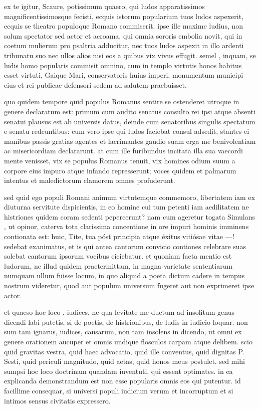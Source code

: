  ex te igitur, Scaure, potissimum quaero, qui ludos apparatissimos magnificentissimosque fecisti, ecquis istorum popularium tuos ludos aspexerit, ecquis se theatro populoque Romano commiserit. ipse ille maxime ludius, non solum spectator sed actor et acroama, qui omnia sororis embolia novit, qui in coetum mulierum pro psaltria adducitur, nec tuos ludos aspexit in illo ardenti tribunatu suo nec ullos alios nisi eos a quibus vix vivus effugit. semel , inquam, se ludis homo popularis commisit omnino, cum in templo virtutis honos habitus esset virtuti, Gaique Mari, conservatoris huius imperi, monumentum municipi eius et rei publicae defensori sedem ad salutem praebuisset.

 quo quidem tempore quid populus Romanus sentire se ostenderet utroque in genere declaratum est: primum cum audito senatus consulto rei ipsi atque absenti senatui plausus est ab universis datus, deinde cum senatoribus singulis spectatum e senatu redeuntibus: cum vero ipse qui ludos faciebat consul adsedit, stantes ei manibus passis gratias agentes et lacrimantes gaudio suam erga me benivolentiam ac misericordiam declararunt. at cum ille furibundus incitata illa sua vaecordi mente venisset, vix se populus Romanus tenuit, vix homines odium suum a corpore eius impuro atque infando represserunt; voces quidem et palmarum intentus et maledictorum clamorem omnes profuderunt.

 sed quid ego populi Romani animum virtutemque commemoro, libertatem iam ex diuturna servitute dispicientis, in eo homine cui tum petenti iam aedilitatem ne histriones quidem coram sedenti pepercerunt? nam cum ageretur togata Simulans , ut opinor, caterva tota clarissima concentione in ore impuri hominis imminens contionata est: huic, Tite, tua póst principia atque éxitus vitiósae vitae —! sedebat exanimatus, et is qui antea cantorum convicio contiones celebrare suas solebat cantorum ipsorum vocibus eiciebatur. et quoniam facta mentio est ludorum, ne illud quidem praetermittam, in magna varietate sententiarum numquam ullum fuisse locum, in quo aliquid a poeta dictum cadere in tempus nostrum videretur, quod aut populum universum fugeret aut non exprimeret ipse actor.

 et quaeso hoc loco , iudices, ne qua levitate me ductum ad insolitum genus dicendi labi putetis, si de poetis, de histrionibus, de ludis in iudicio loquar. non sum tam ignarus, iudices, causarum, non tam insolens in dicendo, ut omni ex genere orationem aucuper et omnis undique flosculos carpam atque delibem. scio quid gravitas vestra, quid haec advocatio, quid ille conventus, quid dignitas P. Sesti, quid periculi magnitudo, quid aetas, quid honos meus postulet. sed mihi sumpsi hoc loco doctrinam quandam iuventuti, qui essent optimates. in ea explicanda demonstrandum est non esse popularis omnis eos qui putentur. id facillime consequar, si universi populi iudicium verum et incorruptum et si intimos sensus civitatis expressero.

